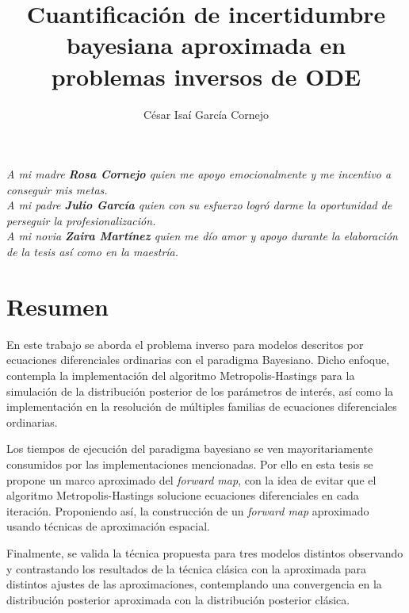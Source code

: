 \documentclass[letterpaper,12pt,twoside]{book}  %
\author{César Isaí García Cornejo}
\title{Cuantificación de incertidumbre bayesiana aproximada en problemas inversos de ODE}
\begin{document}
\maketitle  %

\thispagestyle{empty}  %

\frontmatter

\chapter*{}
\begin{flushright}%
  \emph{A mi madre \textbf{Rosa Cornejo} quien me apoyo emocionalmente y me incentivo a conseguir mis metas. \\A mi padre \textbf{Julio García} quien con su esfuerzo logró darme la oportunidad de perseguir la profesionalización.\\
  A mi novia \textbf{Zaira Martínez} quien me dío amor y apoyo durante la elaboración de la tesis así como en la maestría. }
  \thispagestyle{empty}
\end{flushright}

\chapter*{Resumen}

En este trabajo se aborda el problema inverso para modelos descritos por ecuaciones diferenciales ordinarias con el paradigma Bayesiano. Dicho enfoque, contempla la implementación del algoritmo Metropolis-Hastings para la simulación de la distribución posterior de los parámetros de interés, así como la implementación en la resolución de múltiples familias de ecuaciones diferenciales ordinarias. 

Los tiempos de ejecución del paradigma bayesiano se ven mayoritariamente consumidos por las implementaciones mencionadas. Por ello en esta tesis se propone un marco aproximado del \textit{forward map}, con la idea de evitar que el algoritmo Metropolis-Hastings solucione ecuaciones diferenciales en cada iteración. Proponiendo así, la construcción de un \textit{forward map} aproximado usando técnicas de aproximación espacial.

Finalmente, se valida la técnica propuesta para tres modelos distintos observando y contrastando los resultados de la técnica clásica con la aproximada para distintos ajustes de las aproximaciones, contemplando una convergencia en la distribución posterior aproximada con la distribución posterior clásica.
\end{document}
